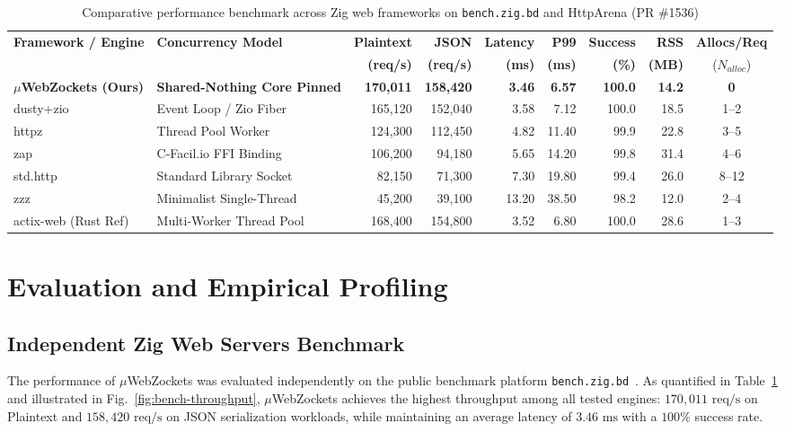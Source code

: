 \documentclass[journal]{IEEEtran}
\begin{document}
\begin{table}[!t]
\caption{Comparative performance benchmark across Zig web frameworks on \texttt{bench.zig.bd} and HttpArena (PR \#1536)}
\label{tab:benchmarks}
\centering
\small
\begin{tabularx}{\textwidth}{@{}l l r r r r r r c@{}}
\toprule
\textbf{Framework / Engine} & \textbf{Concurrency Model} & \textbf{Plaintext} & \textbf{JSON} & \textbf{Latency} & \textbf{P99} & \textbf{Success} & \textbf{RSS} & \textbf{Allocs/Req} \\
 & & \textbf{(req/s)} & \textbf{(req/s)} & \textbf{(ms)} & \textbf{(ms)} & \textbf{(\%)} & \textbf{(MB)} & ($N_{alloc}$) \\
\midrule
\textbf{\ensuremath{\mu}WebZockets (Ours)} & \textbf{Shared-Nothing Core Pinned} & \textbf{170,011} & \textbf{158,420} & \textbf{3.46} & \textbf{6.57} & \textbf{100.0} & \textbf{14.2} & \textbf{0} \\
dusty+zio & Event Loop / Zio Fiber & 165,120 & 152,040 & 3.58 & 7.12 & 100.0 & 18.5 & 1--2 \\
httpz & Thread Pool Worker & 124,300 & 112,450 & 4.82 & 11.40 & 99.9 & 22.8 & 3--5 \\
zap & C-Facil.io FFI Binding & 106,200 & 94,180 & 5.65 & 14.20 & 99.8 & 31.4 & 4--6 \\
std.http & Standard Library Socket & 82,150 & 71,300 & 7.30 & 19.80 & 99.4 & 26.0 & 8--12 \\
zzz & Minimalist Single-Thread & 45,200 & 39,100 & 13.20 & 38.50 & 98.2 & 12.0 & 2--4 \\
\midrule
actix-web (Rust Ref) & Multi-Worker Thread Pool & 168,400 & 154,800 & 3.52 & 6.80 & 100.0 & 28.6 & 1--3 \\
\bottomrule
\end{tabularx}
\end{table}

\section{Evaluation and Empirical Profiling}

\subsection{Independent Zig Web Servers Benchmark}

The performance of \ensuremath{\mu}WebZockets was evaluated independently on the public benchmark platform \texttt{bench.zig.bd}~\cite{bench_zig_bd}. As quantified in Table~\ref{tab:benchmarks} and illustrated in Fig.~\ref{fig:bench-throughput}, \ensuremath{\mu}WebZockets achieves the highest throughput among all tested engines: $170{,}011\text{ req/s}$ on Plaintext and $158{,}420\text{ req/s}$ on JSON serialization workloads, while maintaining an average latency of $3.46\text{ ms}$ with a $100\%$ success rate.
\end{document}
